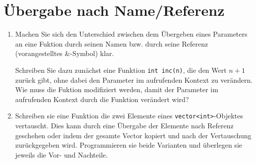 \documentclass[paper=a4, fontsize=11pt, twoside]{scrartcl}
\begin{document}
\section*{Übergabe nach Name/Referenz}
\begin{enumerate}[resume]
\item Machen Sie sich den Unterschied zwischen dem Übergeben eines Parameters an eine Fuktion durch seinen Namen bzw. durch seine Referenz (vorangestelltes \textrm{\&}-Symbol) klar. \par
  Schreiben Sie dazu zunächst eine Funktion \texttt{int inc(n)}, die den Wert $n+1$ zurück gibt, ohne dabei den Parameter im aufrufenden Kontext zu verändern. \\
  Wie muss die Fuktion modifiziert werden, damit der Parameter im aufrufenden Kontext durch die Funktion verändert wird? 
  \item Schreiben sie eine Funktion die zwei Elemente eines \texttt{vector<int>}-Objektes vertauscht. 
	  Dies kann durch eine Übergabe der Elemente nach Referenz geschehen oder indem der gesamte Vector kopiert und nach der Vertauschung zurückgegeben wird. Programmieren sie beide Varianten und überlegen sie jeweils die Vor- und Nachteile.
\end{enumerate}
\end{document}
